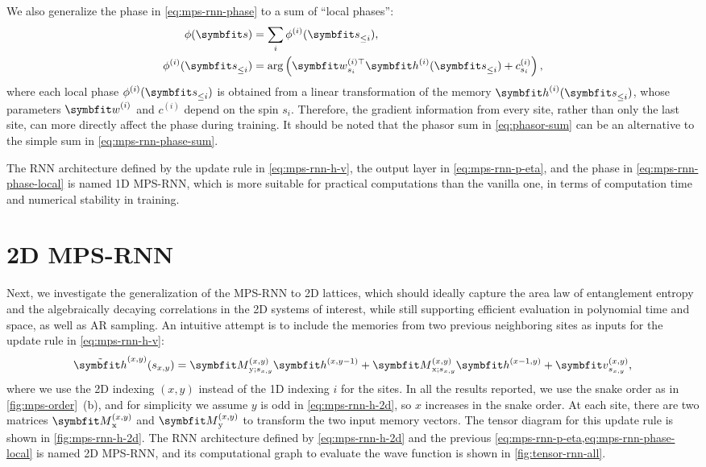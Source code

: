We also generalize the phase in \cref{eq:mps-rnn-phase} to a sum of ``local phases'':
\begin{align}
\phi(\vs) &= \sum_i \phi^{(i)}(\vs_{\le i}), \label{eq:mps-rnn-phase-sum} \\
\phi^{(i)}(\vs_{\le i}) &= \arg\left( \vw^{(i) \transpose}_{s_i} \vh^{(i)}(\vs_{\le i}) + c^{(i)}_{s_i} \right), \label{eq:mps-rnn-phase-local}
\end{align}
where each local phase $\phi^{(i)}(\vs_{\le i})$ is obtained from a linear transformation of the memory $\vh^{(i)}(\vs_{\le i})$, whose parameters $\vw^{(i)}$ and $c^{(i)}$ depend on the spin $s_i$. Therefore, the gradient information from every site, rather than only the last site, can more directly affect the phase during training. It should be noted that the phasor sum in \cref{eq:phasor-sum} can be an alternative to the simple sum in \cref{eq:mps-rnn-phase-sum}.

The RNN architecture defined by the update rule in \cref{eq:mps-rnn-h-v}, the output layer in \cref{eq:mps-rnn-p-eta}, and the phase in \cref{eq:mps-rnn-phase-local} is named 1D MPS-RNN, which is more suitable for practical computations than the vanilla one, in terms of computation time and numerical stability in training.

\section{2D MPS-RNN}
\label{sec:2d-mps-rnn}

Next, we investigate the generalization of the MPS-RNN to 2D lattices, which should ideally capture the area law of entanglement entropy and the algebraically decaying correlations in the 2D systems of interest, while still supporting efficient evaluation in polynomial time and space, as well as AR sampling. An intuitive attempt is to include the memories from two previous neighboring sites as inputs for the update rule in \cref{eq:mps-rnn-h-v}:
\begin{equation}
\tilde{\vh}^{(x, y)}(s_{x, y}) =
\mM^{(x, y)}_{\text{y}; s_{x, y}} \vh^{(x, y - 1)}
+ \mM^{(x, y)}_{\text{x}; s_{x, y}} \vh^{(x - 1, y)}
+ \vv^{(x, y)}_{s_{x, y}},
\label{eq:mps-rnn-h-2d}
\end{equation}
where we use the 2D indexing $(x, y)$ instead of the 1D indexing $i$ for the sites. In all the results reported, we use the snake order as in \cref{fig:mps-order}~(b), and for simplicity we assume $y$ is odd in \cref{eq:mps-rnn-h-2d}, so $x$ increases in the snake order. At each site, there are two matrices $\mM^{(x, y)}_\text{x}$ and $\mM^{(x, y)}_\text{y}$ to transform the two input memory vectors. The tensor diagram for this update rule is shown in \cref{fig:mps-rnn-h-2d}. The RNN architecture defined by \cref{eq:mps-rnn-h-2d} and the previous \cref{eq:mps-rnn-p-eta,eq:mps-rnn-phase-local} is named 2D MPS-RNN, and its computational graph to evaluate the wave function is shown in \cref{fig:tensor-rnn-all}.

